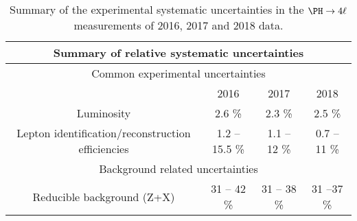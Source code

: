 \begin{table}[!htb]
	\begin{center}
		\small
		\caption{
			Summary of the experimental systematic uncertainties in the $\Hllll$ measurements of 2016, 2017 and 2018 data. %
			\label{tab:SystOverviewABC}
		}
		\begin{tabular}{|c|c|c|c|} 
			\hline %
			\hline %
			\multicolumn{4}{|c|}{\textbf{Summary of relative systematic uncertainties}} \\
			\hline %
			\hline %
			\multicolumn{4}{|c|}{Common experimental uncertainties} \\
			\hline %
			  & 2016 & 2017 & 2018 \\
      \hline %
			Luminosity & 2.6 \% & 2.3 \% & 2.5 \% \\ 
			Lepton identification/reconstruction efficiencies & 1.2 -- 15.5 \% & 1.1 -- 12 \% & 0.7 -- 11 \% \\ 
			\hline %
			\hline %
			\multicolumn{4}{|c|}{Background related uncertainties} \\
			\hline %
			Reducible background (Z+X) & 31 -- 42 \% & 31 -- 38 \%  & 31 --37 \% \\ 

\end{tabular}
\end{center}
\end{table}

